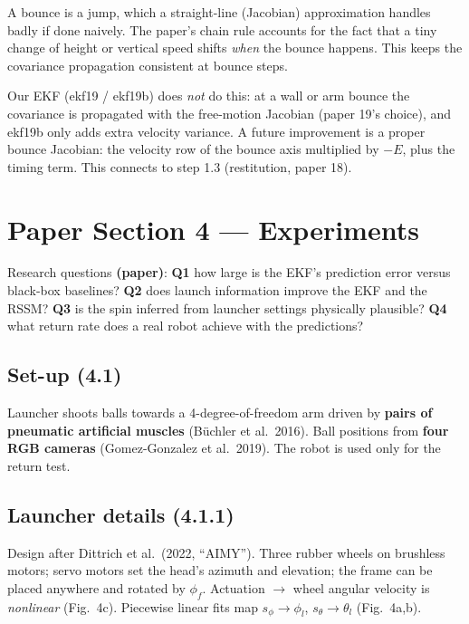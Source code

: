 \documentclass[11pt,a4paper]{article}
\begin{document}
\begin{idea}
A bounce is a jump, which a straight-line (Jacobian) approximation handles badly if done naively. The paper's chain rule accounts for the fact that a tiny change of height or vertical speed shifts \emph{when} the bounce happens.
This keeps the covariance propagation consistent at bounce steps.
\end{idea}
\begin{ours}
Our EKF (ekf19 / ekf19b) does \emph{not} do this: at a wall or arm bounce the covariance is propagated with the free-motion Jacobian (paper 19's choice), and ekf19b only adds extra velocity variance.
A future improvement is a proper bounce Jacobian: the velocity row of the bounce axis multiplied by $-E$, plus the timing term. This connects to step 1.3 (restitution, paper 18).
\end{ours}

\section{Paper Section 4 --- Experiments}
Research questions \textbf{(paper)}: \textbf{Q1} how large is the EKF's prediction error versus black-box baselines? \textbf{Q2} does launch information improve the EKF and the RSSM?
\textbf{Q3} is the spin inferred from launcher settings physically plausible? \textbf{Q4} what return rate does a real robot achieve with the predictions?

\subsection{Set-up (4.1)}
Launcher shoots balls towards a 4-degree-of-freedom arm driven by \textbf{pairs of pneumatic artificial muscles} (B\"uchler et al.\ 2016). Ball positions from \textbf{four RGB cameras} (Gomez-Gonzalez et al.\ 2019). The robot is used only for the return test.

\subsection{Launcher details (4.1.1)}
Design after Dittrich et al.\ (2022, ``AIMY''). Three rubber wheels on brushless motors; servo motors set the head's azimuth and elevation; the frame can be placed anywhere and rotated by $\phi_f$.
Actuation $\to$ wheel angular velocity is \emph{nonlinear} (Fig.~4c). Piecewise linear fits map $s_\phi\to\phi_l$, $s_\theta\to\theta_l$ (Fig.~4a,b).
\end{document}

